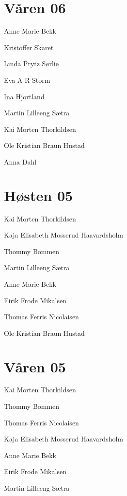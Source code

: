 \section*{Våren 06}

\begin{description}
	\item[Leder] Anne Marie Bekk
	\item Kristoffer Skaret
	\item Linda Prytz Sørlie
	\item Eva A-R Storm
	\item Ina Hjortland
	\item Martin Lilleeng Sætra
	\item Kai Morten Thorkildsen
	\item Ole Kristian Braun Hustad
	\item Anna Dahl
\end{description}

\section*{Høsten 05}

\begin{description}
	\item[Leder] Kai Morten Thorkildsen
	\item Kaja Elisabeth Mosserud Haavardsholm
	\item Thommy Bommen
	\item Martin Lilleeng Sætra
	\item Anne Marie Bekk
	\item Eirik Frode Mikalsen
	\item Thomas Ferris Nicolaisen
	\item Ole Kristian Braun Hustad
\end{description}

\section*{Våren 05}

\begin{description}
	\item[Leder] Kai Morten Thorkildsen
	\item Thommy Bommen
	\item Thomas Ferris Nicolaisen
	\item Kaja Elisabeth Mosserud Haavardsholm
	\item Anne Marie Bekk
	\item Eirik Frode Mikalsen
	\item Martin Lilleeng Sætra
\end{description}

